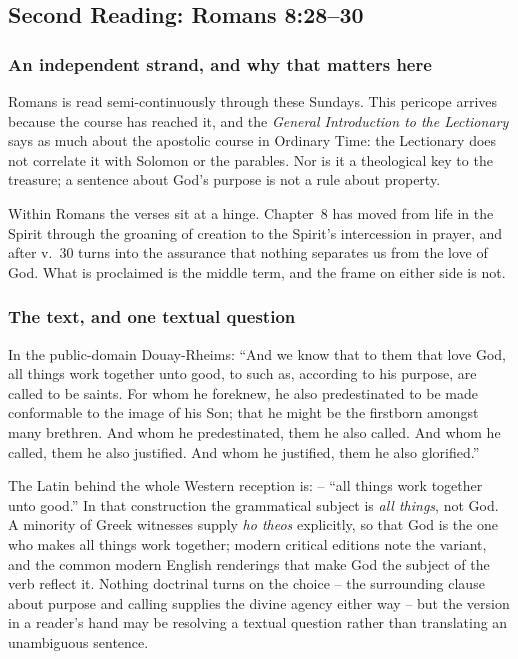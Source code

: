 \subsection*{Second Reading: Romans 8:28--30}

\subsubsection*{An independent strand, and why that matters here}

Romans is read semi-continuously through these Sundays. This pericope arrives because the course has reached it, and the \emph{General Introduction to the Lectionary} says as much about the apostolic course in Ordinary Time: the Lectionary does not correlate it with Solomon or the parables. Nor is it a theological key to the treasure; a sentence about God's purpose is not a rule about property.

Within Romans the verses sit at a hinge. Chapter~8 has moved from life in the Spirit through the groaning of creation to the Spirit's intercession in prayer, and after v.~30 turns into the assurance that nothing separates us from the love of God. What is proclaimed is the middle term, and the frame on either side is not.

\subsubsection*{The text, and one textual question}

In the public-domain Douay-Rheims: ``And we know that to them that love God, all things work together unto good, to such as, according to his purpose, are called to be saints. For whom he foreknew, he also predestinated to be made conformable to the image of his Son; that he might be the firstborn amongst many brethren. And whom he predestinated, them he also called. And whom he called, them he also justified. And whom he justified, them he also glorified.''

The Latin behind the whole Western reception is:  -- ``all things work together unto good.'' In that construction the grammatical subject is \emph{all things}, not God. A minority of Greek witnesses supply \emph{ho theos} explicitly, so that God is the one who makes all things work together; modern critical editions note the variant, and the common modern English renderings that make God the subject of the verb reflect it. Nothing doctrinal turns on the choice -- the surrounding clause about purpose and calling supplies the divine agency either way -- but the version in a reader's hand may be resolving a textual question rather than translating an unambiguous sentence.


